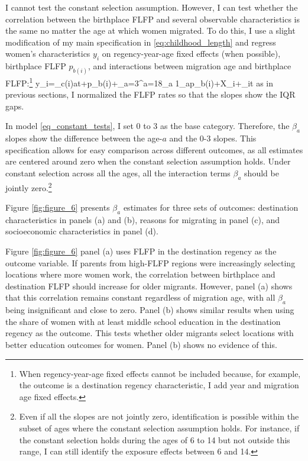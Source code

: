 I cannot test the constant selection assumption. However, I can test whether the correlation between the birthplace FLFP and several observable characteristics is the same no matter the age at which women migrated. To do this, I use a slight modification of my main specification in \eqref{eq:childhood_length} and regress women's characteristics $y_i$ on regency-year-age fixed effects (when possible), birthplace FLFP $p_{b(i)}$, and interactions between migration age and birthplace FLFP:\footnote{When regency-year-age fixed effects cannot be included because, for example, the outcome is a destination regency characteristic, I add year and migration age fixed effects.} 
\beqn
\label{eq_constant_tests}
y_{i}=\omega_{c(i)at}+\beta p_{b(i)}+\sum_{a=3}^{a=18}\beta_a 1_a\times p_{b(i)}+X_i\kappa+\varepsilon_{it}
\eeqn
as in previous sections, I normalized the FLFP rates so that the slopes show the IQR gaps.


In model \eqref{eq_constant_tests}, I set 0 to 3 as the base category. Therefore, the $\beta_a$ slopes show the difference between the age-$a$ and the 0-3 slopes. This specification allows for easy comparison across different outcomes, as all estimates are centered around zero when the constant selection assumption holds. Under constant selection across all the ages,  {all the interaction terms $\beta_a$ should be jointly zero}.\footnote{Even if all the slopes are not jointly zero, identification is possible within the subset of ages where the constant selection assumption holds. For instance, if the constant selection holds during the ages of 6 to 14 but not outside this range,  I can still identify the exposure effects between 6 and 14.}


Figure \ref{fig:figure_6} presents  $\beta_a$ estimates for three sets of outcomes: destination characteristics in panels (a) and (b), reasons for migrating in panel (c), and socioeconomic characteristics in panel (d). 




Figure \ref{fig:figure_6} panel (a) uses FLFP in the destination regency as the outcome variable. If parents from high-FLFP regions were increasingly selecting locations where more women work, the correlation between birthplace and destination FLFP should increase for older migrants. However, panel (a) shows that this correlation remains constant regardless of migration age, with all $\beta_a$ being insignificant and close to zero. Panel (b) shows similar results when using the share of women with at least middle school education in the destination regency as the outcome. This tests whether older migrants select locations with better education outcomes for women. Panel (b) shows no evidence of this.

